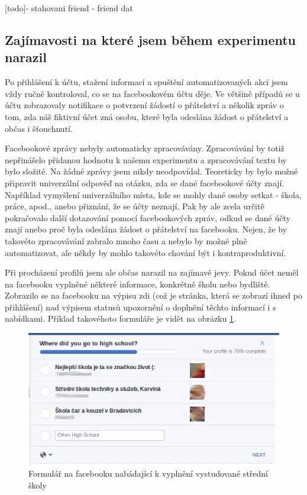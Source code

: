 \documentclass[thesis=M,czech]{FITthesis}[2013/05/10]
\begin{document}
[todo]- stahovani friend - friend dat

\subsection{Zajímavosti na které jsem během experimentu narazil}

Po přihlášení k účtu, stažení informací a spuštění automatizovaných akcí jsem vždy ručně kontroloval, co se na facebookovém účtu děje. Ve většině případů se u účtu zobrazovaly notifikace o potvrzení žádostí o přátelství a několik zpráv o tom, zda náš fiktivní účet zná osobu, které byla odeslána žádost o přátelství a občas i šťouchnutí.

Facebookové zprávy nebyly automaticky zpracovávány. Zpracovávání by totiž nepřinášelo přidanou hodnotu k našemu experimentu a zpracovávání textu by bylo složité. Na žádné zprávy jsem nikdy neodpovídal. Teoreticky by bylo možné připravit univerzální odpověď na otázku, zda se dané facebookové účty znají. Například vymyšlení univerzálního místa, kde se mohly dané osoby setkat - škola, práce, apod., anebo přiznání, že se účty neznají. Pak by ale zcela určitě pokračovalo další dotazování pomocí facebookových zpráv, odkud se dané účty znají anebo proč byla odeslána žádost o přátelství na facebooku. Nejen, že by takovéto zpracovávání zabralo mnoho času a nebylo by možné plně automatizovat, ale někdy by mohlo takovéto chování být i kontraproduktivní.

Při procházení profilů jsem ale občas narazil na zajímavé jevy. Pokud účet neměl na facebooku vyplněné některé informace, konkrétně školu nebo bydliště. Zobrazilo se na facebooku na výpisu zdi (což je stránka, která se zobrazí ihned po přihlášení) nad výpisem statusů upozornění o doplnění těchto informací i s nabídkami. Příklad takovéhoto formuláře je vidět na obrázku \ref{fig:completeSchool}.

\begin{figure}[h]
\begin{center}
\includegraphics[width=5in]{figures/completeSchool.png}
\caption{Formulář na facebooku nabádající k vyplnění vystudované střední školy}
\label{fig:completeSchool}
\end{center}
\end{figure}
\end{document}
